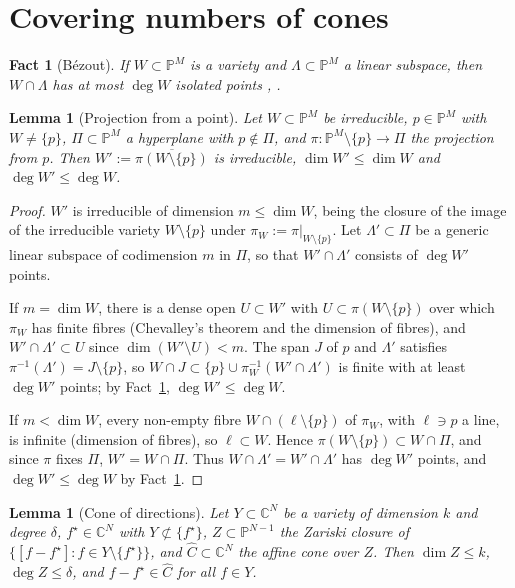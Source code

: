 \documentclass[11pt]{article}
\newtheorem{lemma}[theorem]{Lemma}
\newtheorem{fact}[theorem]{Fact}
\newcommand{\C}{\mathbb{C}}
\newcommand{\PP}{\mathbb{P}}
\newcommand{\fs}{f^{\star}}
\newcommand{\Ch}{\widehat{C}}
\begin{document}
\section{Covering numbers of cones}

\begin{fact}[B\'ezout]\label{fact:bezout}
If $W\subset\PP^M$ is a variety and $\Lambda\subset\PP^M$ a linear subspace, then $W\cap\Lambda$ has at most $\deg W$ isolated points \cite[Example~8.4.6]{Fulton}, \cite{Heintz}.
\end{fact}

\begin{lemma}[Projection from a point]\label{lem:projection}
Let $W\subset\PP^M$ be irreducible, $p\in\PP^M$ with $W\ne\{p\}$, $\Pi\subset\PP^M$ a hyperplane with $p\notin\Pi$, and $\pi:\PP^M\setminus\{p\}\to\Pi$ the projection from $p$. Then $W':=\overline{\pi(W\setminus\{p\})}$ is irreducible, $\dim W'\le\dim W$ and $\deg W'\le\deg W$.
\end{lemma}

\begin{proof}
$W'$ is irreducible of dimension $m\le\dim W$, being the closure of the image of the irreducible variety $W\setminus\{p\}$ under $\pi_W:=\pi|_{W\setminus\{p\}}$. Let $\Lambda'\subset\Pi$ be a generic linear subspace of codimension $m$ in $\Pi$, so that $W'\cap\Lambda'$ consists of $\deg W'$ points.

If $m=\dim W$, there is a dense open $U\subset W'$ with $U\subset\pi(W\setminus\{p\})$ over which $\pi_W$ has finite fibres (Chevalley's theorem and the dimension of fibres), and $W'\cap\Lambda'\subset U$ since $\dim(W'\setminus U)<m$. The span $J$ of $p$ and $\Lambda'$ satisfies $\pi^{-1}(\Lambda')=J\setminus\{p\}$, so $W\cap J\subset\{p\}\cup\pi_W^{-1}(W'\cap\Lambda')$ is finite with at least $\deg W'$ points; by Fact~\ref{fact:bezout}, $\deg W'\le\deg W$.

If $m<\dim W$, every non-empty fibre $W\cap(\ell\setminus\{p\})$ of $\pi_W$, with $\ell\ni p$ a line, is infinite (dimension of fibres), so $\ell\subset W$. Hence $\pi(W\setminus\{p\})\subset W\cap\Pi$, and since $\pi$ fixes $\Pi$, $W'=W\cap\Pi$. Thus $W\cap\Lambda'=W'\cap\Lambda'$ has $\deg W'$ points, and $\deg W'\le\deg W$ by Fact~\ref{fact:bezout}.
\end{proof}

\begin{lemma}[Cone of directions]\label{lem:cone}
Let $Y\subset\C^N$ be a variety of dimension $k$ and degree $\delta$, $\fs\in\C^N$ with $Y\not\subset\{\fs\}$, $Z\subset\PP^{N-1}$ the Zariski closure of $\{[f-\fs]:f\in Y\setminus\{\fs\}\}$, and $\Ch\subset\C^N$ the affine cone over $Z$. Then $\dim Z\le k$, $\deg Z\le\delta$, and $f-\fs\in\Ch$ for all $f\in Y$.
\end{lemma}
\end{document}
